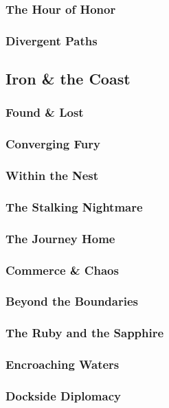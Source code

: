         \subsubsection{The Hour of Honor}
        \subsubsection{Divergent Paths}
        
    \newpage
    \subsection{Iron \& the Coast} \vspace*{\fill}
    \newpage
        \subsubsection{Found \& Lost}
        \subsubsection{Converging Fury}
        \subsubsection{Within the Nest}
        \subsubsection{The Stalking Nightmare}
        \subsubsection{The Journey Home}
        \subsubsection{Commerce & Chaos}
        \subsubsection{Beyond the Boundaries}
        \subsubsection{The Ruby and the Sapphire}
        \subsubsection{Encroaching Waters}
        \subsubsection{Dockside Diplomacy}
        
